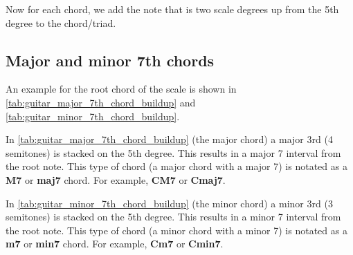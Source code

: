 Now for each chord, we add the note that is two scale degrees up from the 5th degree to the chord/triad.

\subsection{Major and minor 7th chords}

An example for the root chord of the scale is shown in \autoref{tab:guitar_major_7th_chord_buildup} and \autoref{tab:guitar_minor_7th_chord_buildup}.

\begin{minipage}{0.43\textwidth}
	In \autoref{tab:guitar_major_7th_chord_buildup} (the major chord) a major 3rd (4 semitones) is stacked on the 5th degree. This results in a major 7 interval from the root note. This type of chord (a major chord with a major 7) is notated as a \textbf{M7} or \textbf{maj7} chord. For example, \textbf{CM7} or \textbf{Cmaj7}.
\end{minipage}
\hfill
\begin{minipage}{0.43\textwidth}
	In \autoref{tab:guitar_minor_7th_chord_buildup} (the minor chord) a minor 3rd (3 semitones) is stacked on the 5th degree. This results in a minor 7 interval from the root note. This type of chord (a minor chord with a minor 7) is notated as a \textbf{m7} or \textbf{min7} chord. For example, \textbf{Cm7} or \textbf{Cmin7}.
\end{minipage}


